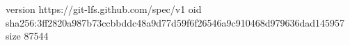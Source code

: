version https://git-lfs.github.com/spec/v1
oid sha256:3ff2820a987b73ccbbddc48a9d77d59f6f26546a9c910468d979636dad145957
size 87544
